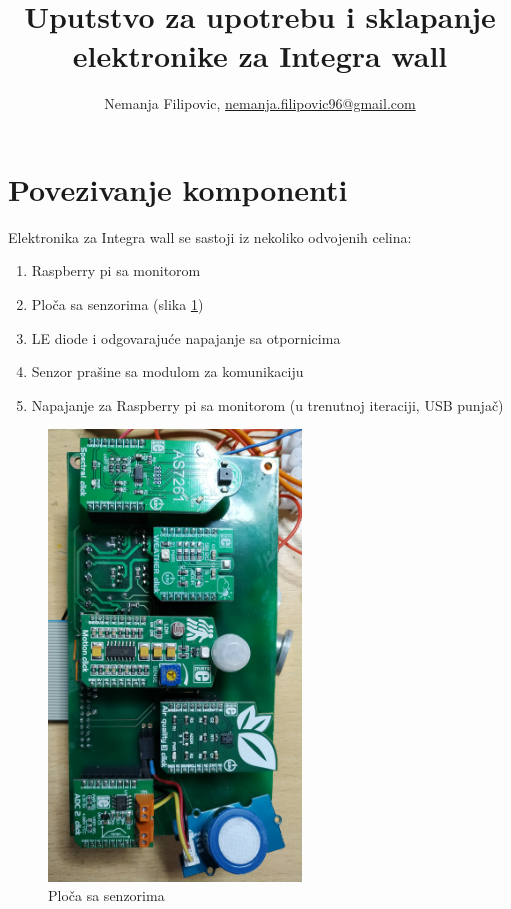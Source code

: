 \documentclass[a4paper]{article}
\title{Uputstvo za upotrebu i sklapanje elektronike za Integra wall}
\author{Nemanja Filipovic, \href{mailto:nemanja.filipovic96@gmail.com}{nemanja.filipovic96@gmail.com}}
\begin{document}
	\maketitle
	
	\section{Povezivanje komponenti}
	
	Elektronika za Integra wall se sastoji iz nekoliko odvojenih celina:
	\begin{enumerate}
		\item Raspberry pi sa monitorom 
		\item Plo\v ca sa senzorima (slika \ref{fig:sensors})
		\item LE diode i odgovaraju\' ce napajanje sa otpornicima
		\item Senzor pra\v sine sa modulom za komunikaciju
		\item Napajanje za Raspberry pi sa monitorom (u trenutnoj iteraciji, USB punja\v c)
	\end{enumerate}
	
	\begin{figure}[H]
		\centering
		\includegraphics[width=0.6\textwidth]{graphics/sensorBrd.jpg}
		\caption{Plo\v ca sa senzorima}
		\label{fig:sensors}
	\end{figure}
	
\end{document}
